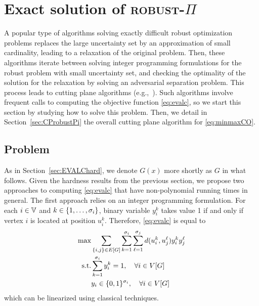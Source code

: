\documentclass[12pt]{article}
\newcommand{\blue}[1]{{\color{black}#1}}
\begin{document}
\section{Exact solution of \textsc{robust}-$\Pi$}
\label{sec:exact}

A popular type of algorithms solving exactly difficult robust optimization problems replaces the large uncertainty set by an approximation of small cardinality, leading to a relaxation of the original problem. Then, these algorithms iterate between solving integer programming formulations for the robust problem with small uncertainty set, and checking the optimality of the solution for the relaxation by solving an adversarial separation problem. This process leads to cutting plane algorithms (e.g.,~\cite{BertsimasDL16,FischettiM12,Naoum-SawayaB16}). Such algorithms involve frequent calls to computing the objective function \ref{eq:evalc}, so we start this section by studying how to solve this problem. Then, we detail in Section~\ref{sec:CProbustPi} the overall cutting plane algorithm for \ref{eq:minmaxCO}. %

\subsection{\blue{Problem \EVALC}}
\label{subsec:tw}

\blue{As in Section~\ref{sec:EVALChard}, we denote $G(x)$ more shortly as $G$ in what follows.}
Given the hardness results from the previous section, we propose two approaches to computing \ref{eq:evalc} that have non-polynomial running times in general. The first approach relies on an integer programming formulation. For each $i\in \mathbb{V}$ and $k\in\{1,\ldots,{\sigma_{i}}\}$, binary variable $y_i^k$ takes value 1 if and only if vertex $i$ is located at position $u_i^k$. Therefore, \ref{eq:evalc} is equal to
\begin{align*}
 \max & \sum_{\{i,j\}\in E[G]} \sum_{k=1}^{{\sigma_{i}}}\sum_{\ell=1}^{{\sigma_{j}}} d(u_i^k,u_j^\ell)y_i^k y_j^\ell\\
 \mbox{s.t.} & \sum_{k=1}^{{\sigma_{i}}} y_i^k =1, \quad \forall i\in V[G] \\
 & y_i\in\{0,1\}^{{\sigma_{i}}},\quad\forall i\in V[G]
\end{align*}
which can be linearized using classical techniques.
\end{document}
